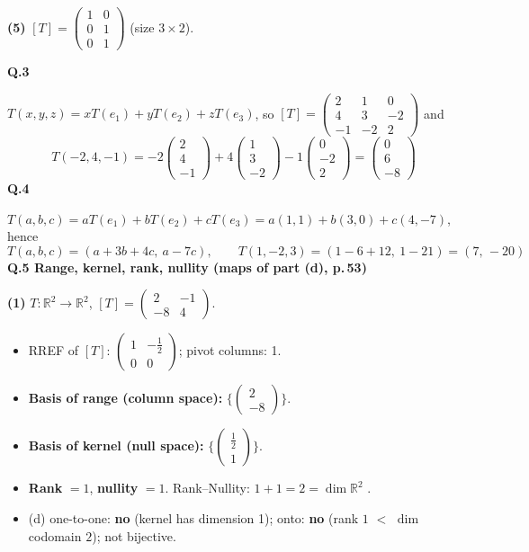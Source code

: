 \noindent\textbf{(5)} $[T]=\begin{pmatrix}1 & 0 \\ 0 & 1 \\ 0 & 1\end{pmatrix}$ (size $3\times2$).

\medskip\noindent\textbf{Q.3}\par\smallskip
$T(x,y,z)=xT(e_1)+yT(e_2)+zT(e_3)$, so $[T]=\begin{pmatrix}2 & 1 & 0 \\ 4 & 3 & -2 \\ -1 & -2 & 2\end{pmatrix}$ and
\[ T(-2,4,-1)=-2\begin{pmatrix}2 \\ 4 \\ -1\end{pmatrix}+4\begin{pmatrix}1 \\ 3 \\ -2\end{pmatrix}-1\begin{pmatrix}0 \\ -2 \\ 2\end{pmatrix}=\begin{pmatrix}0 \\ 6 \\ -8\end{pmatrix} \]
\medskip\noindent\textbf{Q.4}\par\smallskip
$T(a,b,c)=aT(e_1)+bT(e_2)+cT(e_3)=a(1,1)+b(3,0)+c(4,-7)$, hence
\[ T(a,b,c)=(a+3b+4c,\ a-7c),\qquad T(1,-2,3)=(1-6+12,\ 1-21)=(7,\,-20) \]
\medskip\noindent\textbf{Q.5  Range, kernel, rank, nullity (maps of part (d), p.\,53)}\par\smallskip

\noindent\textbf{(1)} $T:\mathbb{R}^2\to\mathbb{R}^2$, $[T]=\begin{pmatrix}2 & -1 \\ -8 & 4\end{pmatrix}$.
\begin{itemize}
\item RREF of $[T]$: $\begin{pmatrix}1 & - \frac{1}{2} \\ 0 & 0\end{pmatrix}$; pivot columns: 1.
\item \textbf{Basis of range (column space):} $\Big\{\begin{pmatrix}2 \\ -8\end{pmatrix}\Big\}$.
\item \textbf{Basis of kernel (null space):} $\Big\{\begin{pmatrix}\frac{1}{2} \\ 1\end{pmatrix}\Big\}$.
\item \textbf{Rank} $=1$, \textbf{nullity} $=1$. Rank--Nullity: $1+1=2=\dim\mathbb{R}^2$ \checkmark.
\item (d) one-to-one: \textbf{no} (kernel has dimension 1); onto: \textbf{no} (rank $1$ $<$ $\dim$ codomain $2$); not bijective.
\end{itemize}

